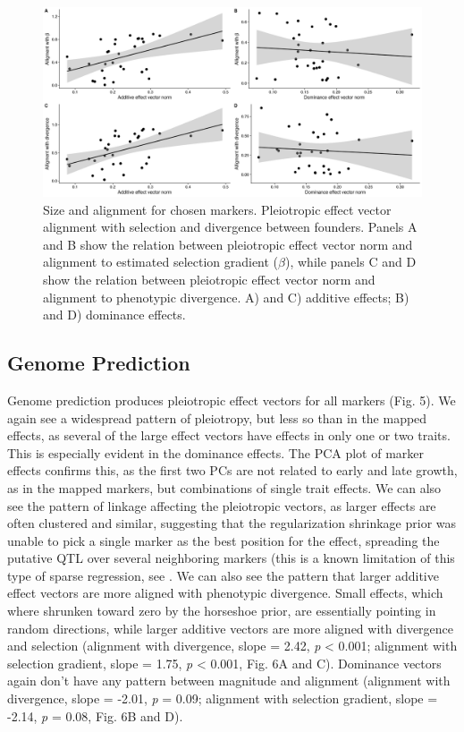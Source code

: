 \begin{refsection}
\begin{figure}
\includegraphics[width=\linewidth]{chapter_JoH-Melo_etal/media/growth_effect_aligment_regressions.png}
\caption[Size and alignment for chosen markers]{Size and alignment for chosen markers. Pleiotropic
effect vector alignment with selection and divergence between founders.
Panels A and B show the relation between pleiotropic effect vector norm and alignment
to estimated selection gradient ($\beta$), while panels C and D show the relation between
pleiotropic effect vector norm and alignment to phenotypic divergence. A)
and C) additive effects; B) and D) dominance effects.}
\end{figure}

\subsection{Genome Prediction}

Genome prediction produces pleiotropic effect vectors for all markers
(Fig. 5). We again see a widespread pattern of pleiotropy, but less so
than in the mapped effects, as several of the large effect vectors have
effects in only one or two traits. This is especially evident in the
dominance effects. The PCA plot of marker effects confirms this, as the
first two PCs are not related to early and late growth, as in the mapped
markers, but combinations of single trait effects. We can also see the
pattern of linkage affecting the pleiotropic vectors, as larger effects
are often clustered and similar, suggesting that the regularization
shrinkage prior was unable to pick a single marker as the best position
for the effect, spreading the putative QTL over several neighboring
markers (this is a known limitation of this type of sparse regression,
see \textcite{Piironen2017-ih}. We can also see the pattern that larger additive effect vectors
are more aligned with phenotypic divergence. Small effects, which where
shrunken toward zero by the horseshoe prior, are essentially pointing in
random directions, while larger additive vectors are more aligned with
divergence and selection (alignment with divergence, slope = 2.42,
\emph{p} \textless{} 0.001; alignment with selection gradient, slope =
1.75, \emph{p} \textless{} 0.001, Fig. 6A and C). Dominance vectors
again don't have any pattern between magnitude and alignment (alignment
with divergence, slope = -2.01, \emph{p} = 0.09; alignment with
selection gradient, slope = -2.14, \emph{p} = 0.08, Fig. 6B and D).


\end{refsection}

